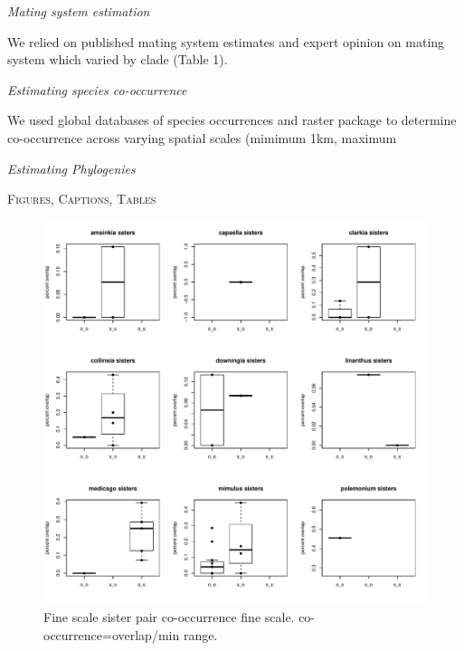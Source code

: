 \documentclass[12pt,letterpaper]{article}
\renewcommand{\section}[1]{%
\bigskip
\begin{center}
\begin{Large}
\normalfont\scshape #1
\medskip
\end{Large}
\end{center}}
\renewcommand{\subsection}[1]{%
\bigskip
\begin{center}
\begin{large}
\normalfont\itshape #1
\end{large}
\end{center}}
\begin{document}
\subsection{Mating system estimation}

We relied on published mating system estimates and expert opinion on mating system which varied by clade (Table 1).  

\subsection{Estimating species co-occurrence}

We used global databases of species occurrences and raster package to determine co-occurrence across varying spatial scales (mimimum 1km, maximum 

\subsection{Estimating Phylogenies}












\section{Figures, Captions, Tables}

\graphicspath{ {./figures/}} %
\begin{figure}[h!]
\caption{Fine scale sister pair co-occurrence fine scale. co-occurrence=overlap/min range.}
\centering
\includegraphics[width=1\textwidth]{sisters_fig008}
\end{figure}
\end{document}
